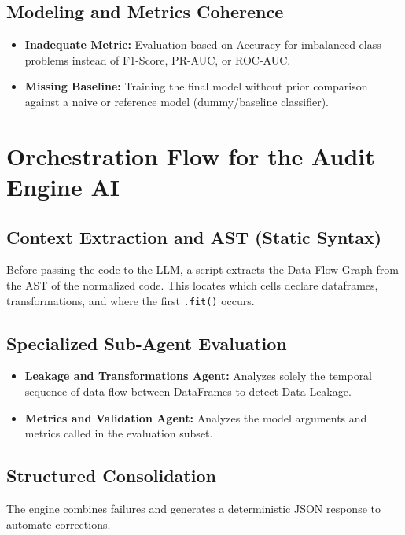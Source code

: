 \documentclass[11pt,a4paper]{article}
\begin{document}
\subsection{Modeling and Metrics Coherence}

\begin{itemize}
  \item \textbf{Inadequate Metric:} Evaluation based on Accuracy for imbalanced class problems instead of F1-Score, PR-AUC, or ROC-AUC.
  \item \textbf{Missing Baseline:} Training the final model without prior comparison against a naive or reference model (dummy/baseline classifier).
\end{itemize}

\section{Orchestration Flow for the Audit Engine AI}

\subsection{Context Extraction and AST (Static Syntax)}

Before passing the code to the LLM, a script extracts the Data Flow Graph from the AST of the normalized code. This locates which cells declare dataframes, transformations, and where the first \texttt{.fit()} occurs.

\subsection{Specialized Sub-Agent Evaluation}

\begin{itemize}
  \item \textbf{Leakage and Transformations Agent:} Analyzes solely the temporal sequence of data flow between DataFrames to detect Data Leakage.
  \item \textbf{Metrics and Validation Agent:} Analyzes the model arguments and metrics called in the evaluation subset.
\end{itemize}

\subsection{Structured Consolidation}

The engine combines failures and generates a deterministic JSON response to automate corrections.
\end{document}
